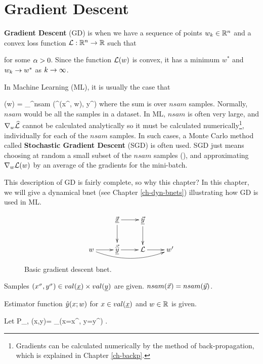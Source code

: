\chapter{Gradient Descent}
\label{ch-gradient-descent}


{\bf Gradient Descent} (GD) is when we have a sequence of points $w_k\in{ \mathbb{R}}^n$ and a convex loss function ${\cal L}:{ \mathbb{R}}^n\rightarrow { \mathbb{R}}$ such that

\beq
{}
\label{eq-grad-descent}
\eeq
for some  $\alpha>0$.
Since the function ${\cal L}(w)$ is convex, 
it has a minimum $w^*$ and $w_k\rightarrow w^*$
as $k\rightarrow \infty$.

In Machine Learning (ML), it
is usually the case that

\beq
\call(w) = \sum_{}^{nsam}
\HAT{\call}(\haty^\s(x^\s, w), y^\s)
\eeq
where the sum is over $nsam$ samples. Normally, $nsam$ would be 
all the samples in a dataset.
In ML, $nsam$ is often very large, 
and $\nabla_w{\widehat{{\cal L}}} $ cannot
be calculated analytically so it must be calculated numerically\footnote{Gradients can 
be calculated numerically 
by the method of
back-propagation, which is explained in Chapter \ref{ch-backp}.},
individually for each of the $nsam$ samples. In such cases,
a Monte Carlo method called {\bf Stochastic Gradient Descent} (SGD)
is often used. 
SGD just means choosing at random
a small subset of the $nsam$ samples (), and
approximating $\nabla_w{\cal L}(w)$ by
an average of the gradients for the mini-batch.

This description of GD is fairly complete, so why this chapter? In this chapter, we will 
give a dynamical bnet (see Chapter \ref{ch-dyn-bnets}) illustrating how GD is used in ML.

\begin{figure}[h!]
\centering
$$\xymatrix{
&\vec{\rvx}\ar[d]\ar[r]&\ul{\vecy}
\ar[d]&\\
w\ar[r]\ar@/_1pc/[rrr]&
\vec{\HAT{\rvy}}\ar[r]&\call\ar[r]&w'
}$$
\caption{Basic gradient descent bnet.}
\label{fig-bfit}
\end{figure}


Samples 
$(x^\s, y^\s)\in val(\rvx)\times val(\rvy)$
are given. $nsam({\vec{x}})=nsam({\vec{y}})$.

Estimator function 
${\hat{y}}(x; w)$
for $x\in val(\rvx)$ and $w\in{ \mathbb{R}}$
is given.

Let 
\beq
P_{\rvx, \rvy}(x,y)=
\sum_\s \indi(x=x^\s, y=y^\s)
\;.
\eeq


